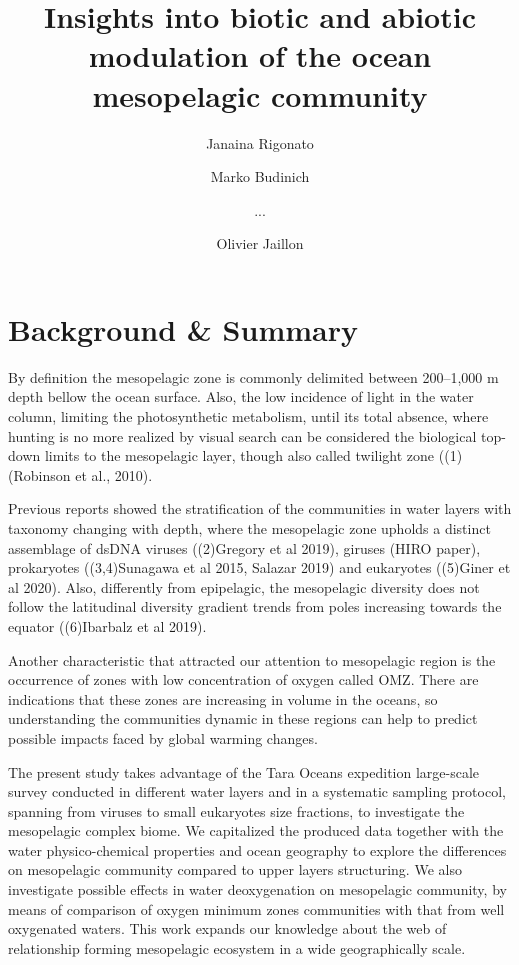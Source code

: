 \documentclass[fleqn,10pt]{wlscirep}
\title{Insights into biotic and abiotic modulation of the ocean mesopelagic community}
\author[1,$\dag$]{Janaina Rigonato}
\author[2,$\dag$]{Marko Budinich}
\author[1,2]{...}
\author[1,*]{Olivier Jaillon}
\affil[1]{Genoscope, department, Evry, postcode, country}
\affil[2]{GO-SEE, department, Roscoff, postcode, country}
\affil[*]{corresponding author(s): Olivier Jaillon (corresponding.author@email.example)}
\affil[$\dag$]{these authors contributed equally to this work}
\begin{document}
\flushbottom
\maketitle

\thispagestyle{empty}



\section*{Background \& Summary}

By definition the mesopelagic zone is commonly delimited between 200–1,000 m depth bellow the ocean surface. Also, the low incidence of light in the water column, limiting the photosynthetic metabolism, until its total absence, where hunting is no more realized by visual search can be considered the biological top-down limits to the mesopelagic layer, though also called twilight zone ((1)(Robinson et al., 2010).

Previous reports showed the stratification of the communities in water layers with taxonomy changing with depth, where the mesopelagic zone upholds a distinct assemblage  of dsDNA viruses ((2)Gregory et al 2019), giruses (HIRO paper), prokaryotes ((3,4)Sunagawa et al 2015, Salazar 2019) and eukaryotes ((5)Giner et al 2020). Also, differently from epipelagic, the mesopelagic diversity does not follow the latitudinal diversity gradient trends from poles increasing towards the equator ((6)Ibarbalz et al 2019).

Another characteristic that attracted our attention to mesopelagic region is the occurrence of zones with low concentration of oxygen called OMZ. There are indications that these zones are increasing in volume in the oceans, so understanding the communities dynamic in these regions can help to predict possible impacts faced by global warming changes.

The present study takes advantage of the Tara Oceans expedition large-scale survey conducted in different water layers and in a systematic sampling protocol, spanning from viruses to small eukaryotes size fractions, to investigate the mesopelagic complex biome. We capitalized the produced data together with the water physico-chemical properties and ocean geography to explore the differences on mesopelagic community compared to upper layers structuring. We also investigate possible effects in water deoxygenation on mesopelagic community, by means of comparison of oxygen minimum zones communities with that from well oxygenated waters. This work expands our knowledge about the web of relationship forming mesopelagic ecosystem in a wide geographically scale.
\end{document}
